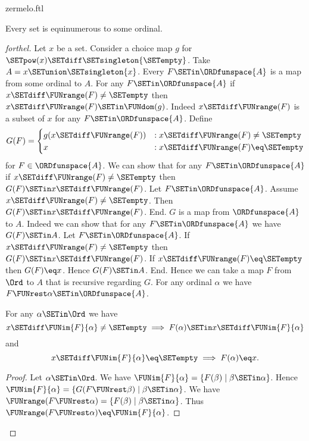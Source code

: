 \documentclass{naproche-library}
\begin{document}
\begin{smodule}[title=Zermelo's Well-Ordering Theorem]{zermelo.ftl}

\begin{theorem}[forthel,title=Zermelo's Well-Ordering Theorem,id=zermelo]
  Every set is equinumerous to some ordinal.
\end{theorem}
\begin{proof}[forthel]
  Let $x$ be a set.
  Consider a choice map $g$ for $\SETpow(x) \SETdiff \SETsingleton{\SETempty}$.
  Take $A = x \SETunion \SETsingleton{x}$.
  Every $F \SETin \ORDfunspace{A}$ is a map from some ordinal to $A$.
  For any $F \SETin \ORDfunspace{A}$ if $x \SETdiff \FUNrange(F) \neq \SETempty$ then $x \SETdiff \FUNrange(F) \SETin \FUNdom(g)$.
  Indeed $x \SETdiff \FUNrange(F)$ is a subset of $x$ for any $F \SETin \ORDfunspace{A}$.
  Define \[ G(F) =
    \begin{cases}
      g(x \SETdiff \FUNrange(F))
      & : x \SETdiff \FUNrange(F) \neq \SETempty
      \\
      x
      & : x \SETdiff \FUNrange(F) \eq \SETempty
    \end{cases} \]
  for $F \in \ORDfunspace{A}$.
  We can show that for any $F \SETin \ORDfunspace{A}$ if $x \SETdiff \FUNrange(F) \neq \SETempty$ then $G(F) \SETin x \SETdiff \FUNrange(F)$.
    Let $F \SETin \ORDfunspace{A}$.
    Assume $x \SETdiff \FUNrange(F) \neq \SETempty$.  
    Then $G(F) \SETin x \SETdiff \FUNrange(F)$.
  End.
  $G$ is a map from $\ORDfunspace{A}$ to $A$.
  Indeed we can show that for any $F \SETin \ORDfunspace{A}$ we have $G(F) \SETin A$.
    Let $F \SETin \ORDfunspace{A}$.
    If $x \SETdiff \FUNrange(F) \neq \SETempty$ then $G(F) \SETin x \SETdiff \FUNrange(F)$.
    If $x \SETdiff \FUNrange(F) \eq \SETempty$ then $G(F) \eq x$.
    Hence $G(F) \SETin A$.
  End.
  Hence we can take a map $F$ from $\Ord$ to $A$ that is recursive regarding $G$.
  For any ordinal $\alpha$ we have $F \FUNrest \alpha \SETin \ORDfunspace{A}$.

  For any $\alpha \SETin \Ord$ we have
  \[ x \SETdiff \FUNim{F}{\alpha} \neq \SETempty \implies F(\alpha) \SETin x \SETdiff \FUNim{F}{\alpha} \]
  and
  \[ x \SETdiff \FUNim{F}{\alpha} \eq \SETempty \implies F(\alpha) \eq x. \]
  \begin{proof}
    Let $\alpha \SETin \Ord$.
    We have $\FUNim{F}{\alpha} = \{ F(\beta) \mid \beta \SETin \alpha \}$.
    Hence $\FUNim{F}{\alpha} = \{ G(F \FUNrest \beta) \mid \beta \SETin \alpha \}$.
    We have $\FUNrange(F \FUNrest \alpha) = \{ F(\beta) \mid \beta \SETin \alpha \}$.
    Thus $\FUNrange(F \FUNrest \alpha) \eq \FUNim{F}{\alpha}$.


\end{proof}
\end{proof}
\end{smodule}
\end{document}
